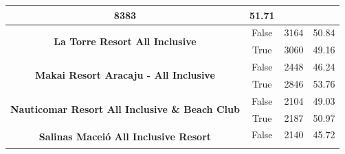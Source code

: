 \begin{table}[]
\begin{tabular}{|c|c|r|r|}
		8383                                                                    &
		51.71                                                                     \\ \hline
		\multirow{2}{*}{\textbf{La Torre Resort All Inclusive}}                 &
		False                                                                   &
		3164                                                                    &
		50.84                                                                     \\ \cline{2-4}
		                                                                        &
		True                                                                    &
		3060                                                                    &
		49.16                                                                     \\ \hline
		\multirow{2}{*}{\textbf{Makai Resort Aracaju - All Inclusive}}          &
		False                                                                   &
		2448                                                                    &
		46.24                                                                     \\ \cline{2-4}
		                                                                        &
		True                                                                    &
		2846                                                                    &
		53.76                                                                     \\ \hline
		\multirow{2}{*}{\textbf{Nauticomar Resort All Inclusive \& Beach Club}} &
		False                                                                   &
		2104                                                                    &
		49.03                                                                     \\ \cline{2-4}
		                                                                        &
		True                                                                    &
		2187                                                                    &
		50.97                                                                     \\ \hline
		\multirow{2}{*}{\textbf{Salinas Maceió All Inclusive Resort}}           &
		False                                                                   &
		2140                                                                    &
		45.72                                                                     \\ \cline{2-4}

\end{tabular}
\end{table}
